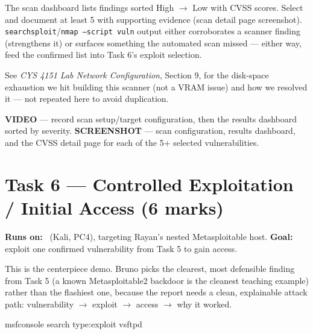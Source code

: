 \documentclass[11pt,a4paper]{article}
\begin{document}
\begin{expectbox}
The scan dashboard lists findings sorted High $\to$ Low with CVSS scores. Select and
document at least 5 with supporting evidence (scan detail page screenshot).
\texttt{searchsploit}/\texttt{nmap --script vuln} output either corroborates a scanner
finding (strengthens it) or surfaces something the automated scan missed --- either
way, feed the confirmed list into Task 6's exploit selection.
\end{expectbox}

\begin{notebox}
See \emph{CYS 4151 Lab Network Configuration}, Section 9, for the disk-space exhaustion
we hit building this scanner (not a VRAM issue) and how we resolved it --- not repeated
here to avoid duplication.
\end{notebox}

\begin{notebox}
\textbf{VIDEO} --- record scan setup/target configuration, then the results dashboard
sorted by severity. \textbf{SCREENSHOT} --- scan configuration, results dashboard, and
the CVSS detail page for each of the 5+ selected vulnerabilities.
\end{notebox}

\clearpage

\section{Task 6 --- Controlled Exploitation / Initial Access (6 marks)}
\textbf{Runs on:} \bruno\ (Kali, PC4), targeting Rayan's nested Metasploitable host.
\quad\textbf{Goal:} exploit one confirmed vulnerability from Task 5 to gain access.

\begin{redbox}
This is the centerpiece demo. Bruno picks the clearest, most defensible finding from
Task 5 (a known Metasploitable2 backdoor is the cleanest teaching example) rather than
the flashiest one, because the report needs a clean, explainable attack path:
vulnerability $\to$ exploit $\to$ access $\to$ why it worked.
\end{redbox}

\begin{cmdbox}
\begin{cmdverb}
msfconsole
search type:exploit vsftpd
\end{cmdverb}
\end{cmdbox}
\end{document}
